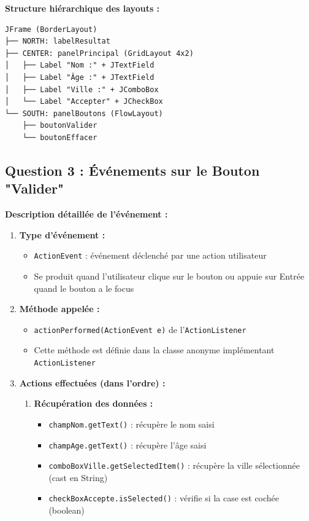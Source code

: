 \documentclass[11pt,a4paper]{article}
\begin{document}
\begin{correctionbox}
\textbf{Structure hiérarchique des layouts :}
\begin{verbatim}
JFrame (BorderLayout)
├── NORTH: labelResultat
├── CENTER: panelPrincipal (GridLayout 4x2)
│   ├── Label "Nom :" + JTextField
│   ├── Label "Âge :" + JTextField
│   ├── Label "Ville :" + JComboBox
│   └── Label "Accepter" + JCheckBox
└── SOUTH: panelBoutons (FlowLayout)
    ├── boutonValider
    └── boutonEffacer
\end{verbatim}
\end{correctionbox}

\subsection{Question 3 : Événements sur le Bouton "Valider"}

\begin{correctionbox}
\textbf{Description détaillée de l'événement :}

\begin{enumerate}
    \item \textbf{Type d'événement :}
    \begin{itemize}
        \item \texttt{ActionEvent} : événement déclenché par une action utilisateur
        \item Se produit quand l'utilisateur clique sur le bouton ou appuie sur Entrée quand le bouton a le focus
    \end{itemize}
    
    \item \textbf{Méthode appelée :}
    \begin{itemize}
        \item \texttt{actionPerformed(ActionEvent e)} de l'\texttt{ActionListener}
        \item Cette méthode est définie dans la classe anonyme implémentant \texttt{ActionListener}
    \end{itemize}
    
    \item \textbf{Actions effectuées (dans l'ordre) :}
    \begin{enumerate}
        \item \textbf{Récupération des données :}
        \begin{itemize}
            \item \texttt{champNom.getText()} : récupère le nom saisi
            \item \texttt{champAge.getText()} : récupère l'âge saisi
            \item \texttt{comboBoxVille.getSelectedItem()} : récupère la ville sélectionnée (cast en String)
            \item \texttt{checkBoxAccepte.isSelected()} : vérifie si la case est cochée (boolean)
        \end{itemize}
        

\end{enumerate}
\end{enumerate}
\end{correctionbox}
\end{document}
